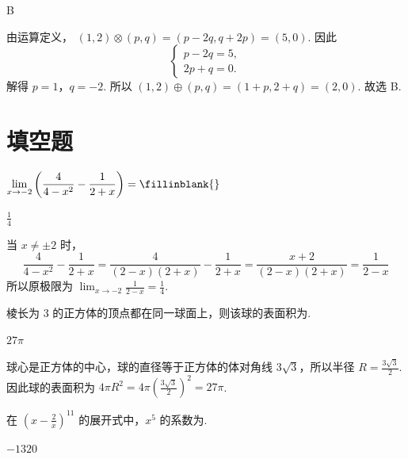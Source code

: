 \begin{answer}
B
\end{answer}

\begin{solution}
由运算定义，
\((1,2)\otimes(p,q)=(p-2q,q+2p)=(5,0)\).
因此
\[
\begin{cases}
p-2q=5,\\
2p+q=0.
\end{cases}
\]
解得 \(p=1\)，\(q=-2\). 所以 \((1,2)\oplus(p,q)=(1+p,2+q)=(2,0)\).
故选 B.
\end{solution}
\section{填空题}

\begin{problem}
\(\displaystyle\lim_{x\to -2}\left(\frac{4}{4 - x^2} -\frac{1}{2 + x}\right) =\fillinblank{}\)
\end{problem}

\begin{answer}
\(\frac14\)
\end{answer}

\begin{solution}
当 \(x\neq\pm2\) 时，
\[
\frac{4}{4-x^2}-\frac{1}{2+x}
=\frac{4}{(2-x)(2+x)}-\frac{1}{2+x}
=\frac{x+2}{(2-x)(2+x)}
=\frac{1}{2-x}
\]
所以原极限为
\(\displaystyle\lim_{x\to-2}\frac{1}{2-x}=\frac14\).
\end{solution}

\begin{problem}
棱长为 \(3\) 的正方体的顶点都在同一球面上，则该球的表面积为\fillinblank{}.
\end{problem}

\begin{answer}
\(27\pi\)
\end{answer}

\begin{solution}
球心是正方体的中心，球的直径等于正方体的体对角线 \(3\sqrt{3}\)，所以半径 \(R=\frac{3\sqrt{3}}{2}\). 因此球的表面积为 \(4\pi R^2=4\pi\left(\frac{3\sqrt{3}}{2}\right)^2=27\pi\).
\end{solution}

\begin{problem}
在 \(\left(x - \frac{2}{x}\right)^{11}\) 的展开式中，\(x^5\) 的系数为\fillinblank{}.
\end{problem}

\begin{answer}
\(-1320\)
\end{answer}

